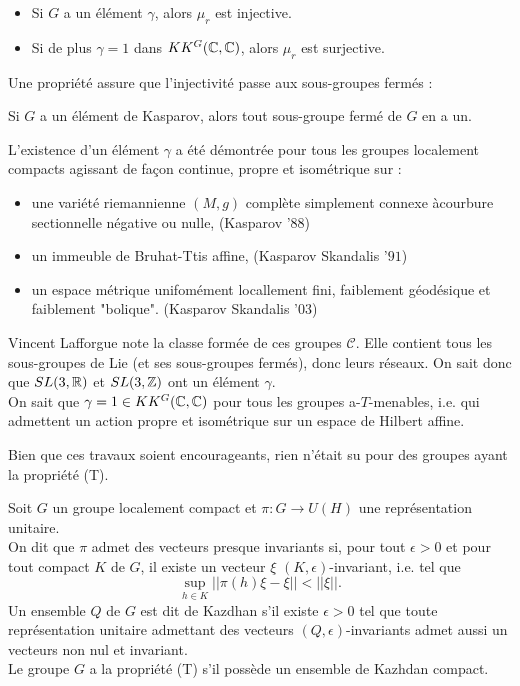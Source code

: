 \begin{Res}[Tu] 
\begin{itemize}
\item Si $G$ a un élément $\gamma$, alors $\mu_r$ est injective.
\item Si de plus $\gamma = 1$ dans $KK^G(\mathbb C,\mathbb C)$, alors $\mu_r$ est surjective.\\
\end{itemize}
\end{Res}

Une propriété assure que l'injectivité passe aux sous-groupes fermés :\\
\begin{prop}
Si $G$ a un élément de Kasparov, alors tout sous-groupe fermé de $G$ en a un.\\
\end{prop}

\begin{Res}
L'existence d'un élément $\gamma$ a été démontrée pour tous les groupes localement compacts agissant de façon continue, propre et isométrique sur :
\begin{itemize}
\item une variété riemannienne $(M,g)$ complète simplement connexe àcourbure sectionnelle négative ou nulle, (Kasparov '$88$)
\item un immeuble de Bruhat-Ttis affine, (Kasparov Skandalis '$91$)
\item un espace métrique unifomément locallement fini, faiblement géodésique et faiblement "bolique". (Kasparov Skandalis '$03$)
\end{itemize}
Vincent Lafforgue note la classe formée de ces groupes $\mathcal C$. Elle contient tous les sous-groupes de Lie (et ses sous-groupes fermés), donc leurs réseaux. On sait donc que $SL(3,\mathbb R)$ et $SL(3,\mathbb Z)$ ont un élément $\gamma$.\\

On sait que $\gamma = 1\in KK^G(\mathbb C,\mathbb C)$ pour tous les groupes a-$T$-menables, i.e. qui admettent un action propre et isométrique sur un espace de Hilbert affine. \\
\end{Res}

Bien que ces travaux soient encourageants, rien n'était su pour des groupes ayant la propriété (T).\\

\begin{definition}
Soit $G$ un groupe localement compact et $\pi : G\rightarrow U(H)$ une représentation unitaire. \\
On dit que $\pi$ admet des vecteurs presque invariants si, pour tout $\epsilon>0$ et pour tout compact $K$ de $G$, il existe un vecteur $\xi$ $(K,\epsilon)$-invariant, i.e. tel que 
\[\sup_{h\in K}||\pi(h)\xi - \xi||<||\xi||.\]
Un ensemble $Q$ de $G$ est dit de Kazdhan s'il existe $\epsilon>0$ tel que toute représentation unitaire admettant des vecteurs $(Q,\epsilon)$-invariants admet aussi un vecteurs non nul et invariant. \\
Le groupe $G$ a la propriété (T) s'il possède un ensemble de Kazhdan compact.\\
\end{definition}

